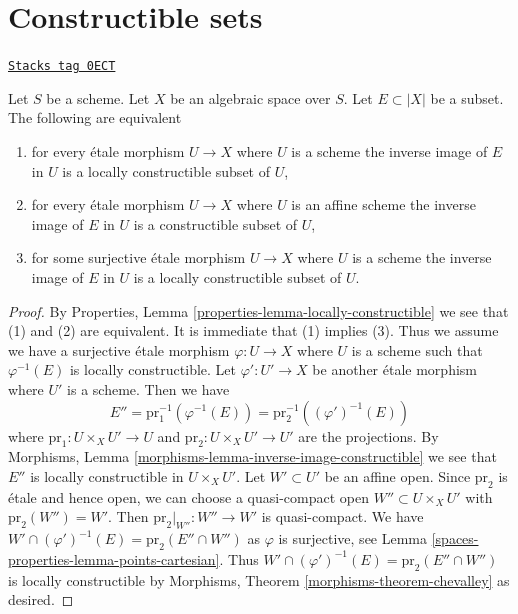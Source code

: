 \section{Constructible sets}
\label{spaces-properties-section-constructible}
\begin{lemma}
\label{spaces-properties-lemma-locally-constructible}
\href{https://stacks.math.columbia.edu/tag/0ECT}{\texttt{Stacks tag 0ECT}}

Let $S$ be a scheme. Let $X$ be an algebraic space over $S$.
Let $E \subset |X|$ be a subset. The following are equivalent
\begin{enumerate}
\item for every \'etale morphism $U \to X$ where $U$ is a
scheme the inverse image of $E$ in $U$ is a locally constructible
subset of $U$,
\item for every \'etale morphism $U \to X$ where $U$ is an
affine scheme the inverse image of $E$ in $U$ is a constructible
subset of $U$,
\item for some surjective \'etale morphism $U \to X$ where $U$ is a
scheme the inverse image of $E$ in $U$ is a locally constructible
subset of $U$.
\end{enumerate}
\end{lemma}

\begin{proof}
By Properties, Lemma \ref{properties-lemma-locally-constructible}
we see that (1) and (2) are equivalent. It is immediate that (1)
implies (3). Thus we assume we have a surjective \'etale morphism
$\varphi : U \to X$ where $U$ is a scheme such that $\varphi^{-1}(E)$
is locally constructible. Let $\varphi' : U' \to X$ be another
\'etale morphism where $U'$ is a scheme. Then we have
$$
E'' = \text{pr}_1^{-1}(\varphi^{-1}(E)) = \text{pr}_2^{-1}((\varphi')^{-1}(E))
$$
where $\text{pr}_1 : U \times_X U' \to U$ and
$\text{pr}_2 : U \times_X U' \to U'$ are the projections.
By Morphisms, Lemma \ref{morphisms-lemma-inverse-image-constructible}
we see that $E''$ is locally constructible in $U \times_X U'$.
Let $W' \subset U'$ be an affine open. Since $\text{pr}_2$ is
\'etale and hence open, we can choose a quasi-compact open
$W'' \subset U \times_X U'$ with $\text{pr}_2(W'') = W'$.
Then $\text{pr}_2|_{W''} : W'' \to W'$ is quasi-compact.
We have $W' \cap (\varphi')^{-1}(E) = \text{pr}_2(E'' \cap W'')$
as $\varphi$ is surjective, see Lemma \ref{spaces-properties-lemma-points-cartesian}.
Thus $W' \cap (\varphi')^{-1}(E) = \text{pr}_2(E'' \cap W'')$
is locally constructible by
Morphisms, Theorem \ref{morphisms-theorem-chevalley} as desired.
\end{proof}

